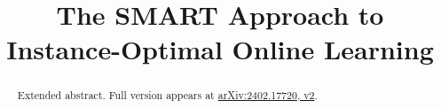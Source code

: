 \documentclass[final,12pt]{colt2024} %
\title[Instance-Optimal Online Learning]{The SMART Approach to Instance-Optimal Online Learning}
\begin{document}
\maketitle

\begin{abstract}%
 

 Extended abstract. Full version appears at \href{https://arxiv.org/abs/2402.17720}{arXiv:2402.17720, v2}.
\end{abstract}

% 
% 
% 
% 
% 
% 

% 

% 
\end{document}
